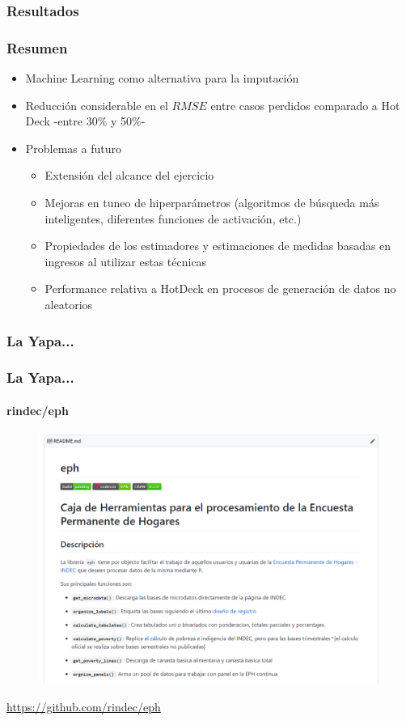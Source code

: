 \documentclass{beamer}
\begin{document}
\subsubsection{Resultados}
\begin{frame}
	\frametitle{Resumen}
	\begin{itemize}
		\item Machine Learning como alternativa para la imputación
		\item Reducción considerable en el $RMSE$ entre casos perdidos comparado a Hot Deck -entre 30\% y 50\%-
		\item Problemas a futuro
		\begin{itemize}
			\item Extensión del alcance del ejercicio
			\item Mejoras en tuneo de hiperparámetros (algoritmos de búsqueda más inteligentes, diferentes funciones de activación, etc.)
			\item Propiedades de los estimadores y estimaciones de medidas basadas en ingresos al utilizar estas técnicas
			\item Performance relativa a HotDeck en procesos de generación de datos no aleatorios
		\end{itemize}
	\end{itemize}
\end{frame}

\subsubsection{La Yapa...}
\begin{frame}
\frametitle{La Yapa... }
\framesubtitle{rindec/eph}
\begin{figure}
	\centering
	\includegraphics[width=0.7 \linewidth, height=0.6 \textheight]{../img/rindec1}
\end{figure}
	\href{https://github.com/rindec/eph}{https://github.com/rindec/eph}
\end{frame}
\end{document}
